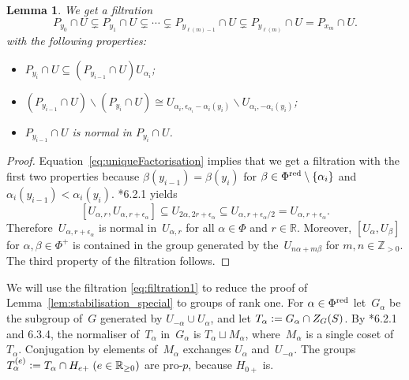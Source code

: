 \documentclass{amsart}
\newtheorem{lem}[theorem]{Lemma}
\theoremstyle{remark}
\theoremstyle{definition}
\newcommand*{\nb}{\nobreakdash}%
\newcommand*{\defeq}{\mathrel{\vcentcolon=}}%
\newcommand*{\Z}{\mathbb Z}%
\newcommand*{\R}{\mathbb R}%
\newcommand*{\ST}{S}%
\newcommand*{\Un}{U}%
\newcommand*{\Phr}{\Phi^\textup{red}}%
\newcommand*{\epal}{\epsilon_\alpha}%
\begin{document}
\begin{lem}
  \label{lem:filtration}
  We get a filtration
  \begin{equation}
    \label{eq:filtration1}
    P_{y_0} \cap U \subsetneq P_{y_1} \cap U \subsetneq \dotsb \subsetneq P_{y_{\ell(m)-1}} \cap U
    \subsetneq P_{y_{\ell(m)}} \cap U  = P_{x_m} \cap U.
  \end{equation}
  with the following properties:
  \begin{itemize}
  \item \(P_{y_i} \cap U \subseteq (P_{y_{i-1}} \cap U) \Un_{\alpha_i}\);
  \item \((P_{y_{i-1}} \cap U) \backslash (P_{y_i} \cap U) \cong \Un_{\alpha_i,\epsilon_{\alpha_i} - \alpha_i (y_i)} \backslash \Un_{\alpha_i,-\alpha_i (y_i)}\);
  \item \(P_{y_{i-1}} \cap U\) is normal in \(P_{y_i} \cap U\).
  \end{itemize}
\end{lem}

\begin{proof}
  Equation~\eqref{eq:uniqueFactorisation} implies that we get a filtration with the first two properties because \(\beta(y_{i-1}) =\beta(y_i)\) for \(\beta\in\Phr\setminus\{\alpha_i\}\) and \(\alpha_i(y_{i-1}) < \alpha_i(y_i)\).
  \cite{Bruhat-Tits:Reductifs_I}*{6.2.1} yields
  \[
  [\Un_{\alpha,r},\Un_{\alpha,r+ \epal}] \subseteq \Un_{2 \alpha, 2r + \epal}
  \subseteq \Un_{\alpha,r + \epal / 2} = \Un_{\alpha,r+ \epal}.
  \]
  Therefore~\(\Un_{\alpha,r+ \epal}\) is normal in~\(\Un_{\alpha,r}\) for all \(\alpha \in \Phi\) and \(r\in\R\).  Moreover, \([\Un_\alpha,\Un_\beta]\) for \(\alpha,\beta \in \Phi^+\) is contained in the group generated by the~\(\Un_{n\alpha + m\beta}\) for \(m,n \in \Z_{>0}\).  The third property of the filtration follows.
\end{proof}

We will use the filtration \eqref{eq:filtration1} to reduce the proof of Lemma~\ref{lem:stabilisation_special} to groups of rank one.  For \(\alpha \in \Phr\) let~\(G_\alpha\) be the subgroup of~\(G\) generated by \(\Un_{-\alpha} \cup \Un_\alpha\), and let \(T_\alpha \defeq G_\alpha \cap Z_G (\ST)\).  By \cite{Bruhat-Tits:Reductifs_I}*{6.2.1 and 6.3.4}, the normaliser of~\(T_\alpha\) in~\(G_\alpha\) is \(T_\alpha \sqcup M_\alpha\), where~\(M_\alpha\) is a single coset of~\(T_\alpha\).  Conjugation by elements of~\(M_\alpha\) exchanges \(\Un_\alpha\) and~\(\Un_{-\alpha}\). The groups \(T_\alpha^{(e)} \defeq T_\alpha \cap H_{e{+}} \; (e \in \R_{\geq 0})\) are pro\nb-\(p\), because \(H_{0+}\) is.
\end{document}
